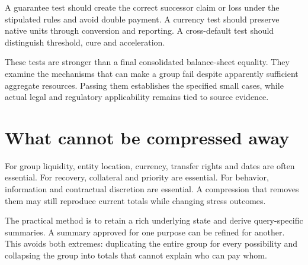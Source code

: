 A guarantee test should create the correct successor claim or loss under the stipulated rules and avoid double payment. A currency test should preserve native units through conversion and reporting. A cross-default test should distinguish threshold, cure and acceleration.

These tests are stronger than a final consolidated balance-sheet equality. They examine the mechanisms that can make a group fail despite apparently sufficient aggregate resources. Passing them establishes the specified small cases, while actual legal and regulatory applicability remains tied to source evidence.

\section{What cannot be compressed away}
For group liquidity, entity location, currency, transfer rights and dates are often essential. For recovery, collateral and priority are essential. For behavior, information and contractual discretion are essential. A compression that removes them may still reproduce current totals while changing stress outcomes.

The practical method is to retain a rich underlying state and derive query-specific summaries. A summary approved for one purpose can be refined for another. This avoids both extremes: duplicating the entire group for every possibility and collapsing the group into totals that cannot explain who can pay whom.
